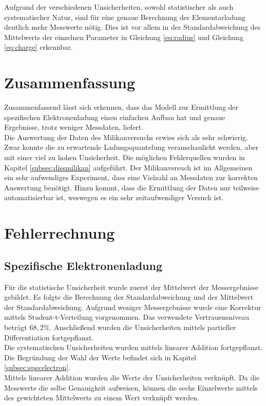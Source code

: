 \documentclass[a4paper,usenatbib]{aspdoc}
\begin{document}
            \noindent Aufgrund der verschiedenen Unsicherheiten, sowohl statistischer als auch systematischer Natur, sind für eine genaue Berechnung der Elementarladung deutlich mehr Messwerte nötig. Dies ist vor allem in der Standardabweichung des Mittelwerts der einzelnen Parameter in Gleichung \ref{eq:radius} und Gleichung \ref{eq:charge} erkennbar. 
       
       
    \section{Zusammenfassung}
        Zusammenfassend lässt sich erkennen, dass das Modell zur Ermittlung der spezifischen Elektronenladung einen einfachen Aufbau hat und genaue Ergebnisse, trotz weniger Messdaten,  liefert.\\
        Die Auswertung der Daten des Milikanversuchs erwies sich als sehr schwierig. Zwar konnte die zu erwartende Ladungsquantelung veranschaulicht werden, aber mit einer viel zu hohen Unsicherheit. Die möglichen Fehlerquellen wurden in Kapitel \ref{subsec:dissmilikan} aufgeführt. Der Milikanversuch ist im Allgemeinen ein sehr aufwendiges Experiment, dass eine Vielzahl an Messdaten zur korrekten Auswertung benötigt. Hinzu kommt, dass die Ermittlung der Daten nur teilweise automatisierbar ist, weswegen es ein sehr zeitaufwendiger Versuch ist. 
            
        
        
    
    
    


    \appendix
    \section{Fehlerrechnung}
        \subsection{Spezifische Elektronenladung}
            Für die statistische Unsicherheit wurde zuerst der Mittelwert der Messergebnisse gebildet. Es folgte die Berechnung der Standardabweichung und der Mittelwert der Standardabweichung. Aufgrund weniger Messergebnisse wurde eine Korrektur mittels Student-t-Verteilung vorgenommen. Das verwendete Vertrauensniveau beträgt $68,2\%$. Anschließend wurden die Unsicherheiten mittels partieller Differentiation fortgepflanzt.\\
            Die systematischen Unsicherheiten wurden mittels linearer Addition fortgepflanzt. Die Begründung der Wahl der Werte befindet sich in Kapitel \ref{subsec:specelectron}.\\
            Mittels linearer Addition wurden die Werte der Unsicherheiten verknüpft. Da die Messwerte die selbe Genauigkeit aufweisen, können die sechs Einzelwerte mittels des gewichteten Mittelwerts zu einem Wert verknüpft werden. 
    
\end{document}
